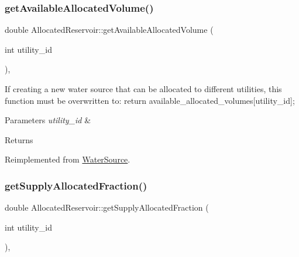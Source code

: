 \mbox{\label{classAllocatedReservoir_ae161ebfc285aa69cb8b7f4fe20ee7a2e}} 
\subsubsection{\texorpdfstring{get\+Available\+Allocated\+Volume()}{getAvailableAllocatedVolume()}}
{\footnotesize\ttfamily double Allocated\+Reservoir\+::get\+Available\+Allocated\+Volume (\begin{DoxyParamCaption}\item[{int}]{utility\+\_\+id }\end{DoxyParamCaption})\hspace{0.3cm}{\ttfamily [override]}, {\ttfamily [virtual]}}

If creating a new water source that can be allocated to different utilities, this function must be overwritten to\+: return available\+\_\+allocated\+\_\+volumes\mbox{[}utility\+\_\+id\mbox{]}; 
\begin{DoxyParams}{Parameters}
{\em utility\+\_\+id} & \\
\hline
\end{DoxyParams}
\begin{DoxyReturn}{Returns}

\end{DoxyReturn}


Reimplemented from \mbox{\hyperlink{classWaterSource_a42c687a3be3d88ba38dbea668c8d35cf}{Water\+Source}}.

\mbox{\label{classAllocatedReservoir_a114e9cde6a106b786ca0ed39283cbbed}} 
\subsubsection{\texorpdfstring{get\+Supply\+Allocated\+Fraction()}{getSupplyAllocatedFraction()}}
{\footnotesize\ttfamily double Allocated\+Reservoir\+::get\+Supply\+Allocated\+Fraction (\begin{DoxyParamCaption}\item[{int}]{utility\+\_\+id }\end{DoxyParamCaption})\hspace{0.3cm}{\ttfamily [override]}, {\ttfamily [virtual]}}



